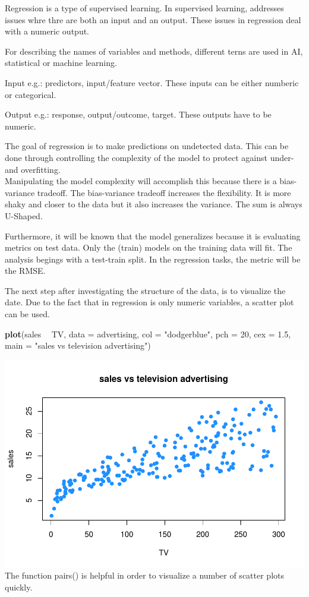 \documentclass[]{report}
\newenvironment{Shaded}{\begin{snugshade}}{\end{snugshade}}
\newcommand{\KeywordTok}[1]{\textcolor[rgb]{0.13,0.29,0.53}{\textbf{#1}}}
\newcommand{\DataTypeTok}[1]{\textcolor[rgb]{0.13,0.29,0.53}{#1}}
\newcommand{\DecValTok}[1]{\textcolor[rgb]{0.00,0.00,0.81}{#1}}
\newcommand{\FloatTok}[1]{\textcolor[rgb]{0.00,0.00,0.81}{#1}}
\newcommand{\StringTok}[1]{\textcolor[rgb]{0.31,0.60,0.02}{#1}}
\newcommand{\OperatorTok}[1]{\textcolor[rgb]{0.81,0.36,0.00}{\textbf{#1}}}
\newcommand{\NormalTok}[1]{#1}
\begin{document}
Regression is a type of supervised learning. In supervised learning,
addresses issues whre thre are both an input and an output. These issues
in regression deal with a numeric output.

For describing the names of variables and methods, different terns are
used in AI, statistical or machine learning.

Input e.g.: predictors, input/feature vector. These inputs can be either
numberic or categorical.

Output e.g.: response, output/outcome, target. These outputs have to be
numeric.

The goal of regression is to make predictions on undetected data. This
can be done through controlling the complexity of the model to protect
against under- and overfitting.\\
Manipulating the model complexity will accomplish this because there is
a bias-variance tradeoff. The bias-variance tradeoff increases the
flexibility. It is more shaky and closer to the data but it also
increases the variance. The sum is always U-Shaped.

Furthermore, it will be known that the model generalizes because it is
evaluating metrics on test data. Only the (train) models on the training
data will fit. The analysis begings with a test-train split. In the
regression tasks, the metric will be the RMSE.

The next step after investigating the structure of the data, is to
visualize the date. Due to the fact that in regression is only numeric
variables, a scatter plot can be used.

\begin{Shaded}
\begin{Highlighting}[]
\KeywordTok{plot}\NormalTok{(sales }\OperatorTok{~}\StringTok{ }\NormalTok{TV, }\DataTypeTok{data =}\NormalTok{ advertising, }\DataTypeTok{col =} \StringTok{"dodgerblue"}\NormalTok{, }\DataTypeTok{pch =} \DecValTok{20}\NormalTok{, }\DataTypeTok{cex =} \FloatTok{1.5}\NormalTok{,}
     \DataTypeTok{main =} \StringTok{"sales vs television advertising"}\NormalTok{)}
\end{Highlighting}
\end{Shaded}

\includegraphics{MyBook_files/figure-latex/unnamed-chunk-71-1.pdf} The
function pairs() is helpful in order to visualize a number of scatter
plots quickly.
\end{document}
